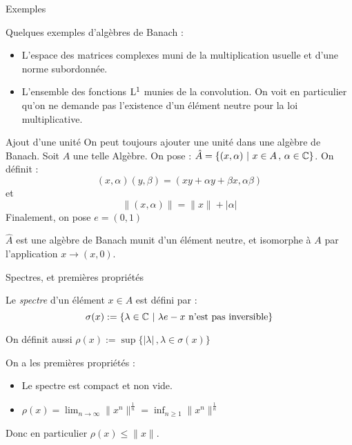 \documentclass[11pt, draft]{beamer}
\begin{document}
\begin{frame}{Exemples}
    
\begin{ex}
    Quelques exemples d'algèbres de Banach  :

    \begin{itemize}
        \item L'espace des matrices complexes muni de la multiplication usuelle et d'une norme subordonnée. 
        \item L'ensemble des fonctions $\mathrm{L}^1$ munies de la convolution. On voit en particulier qu'on ne demande pas
            l'existence d'un élément neutre pour la loi multiplicative.
    \end{itemize}
    \end{ex}
\end{frame}



\begin{frame}{Ajout d'une unité}
    On peut toujours ajouter une unité dans une algèbre de Banach. Soit $A$ une telle Algèbre.
    On pose :
    $\hat{A} = \{ ( x, \alpha) \ | \ x \in A \, ,\, \alpha \in \mathbb{C} \}$. On définit :
    \[
        (x, \alpha) ( y, \beta) = (xy + \alpha y + \beta x, \alpha \beta )
        \]
    et 
    \[
        \| (x, \alpha) \| = \|x\| + |\alpha|
        \]
    Finalement, on pose $e = (0, 1)$
    \begin{myth}
        $\hat{A}$ est une algèbre de Banach munit d'un élément neutre, et isomorphe à $A$ par l'application $x \to (x, 0) $.
    \end{myth}
\end{frame}

\begin{frame}{Spectres, et premières propriétés}
    \begin{mydef}
        Le \emph{spectre} d'un élément $x \in A$ est défini par :
        \[
            \sigma(x) := \{ \lambda \in \mathbb{C} \ | \ \lambda e - x  \ \text{n'est pas inversible} \} 
        \]
    \end{mydef}
    On définit aussi $\rho(x) := \sup \{ |\lambda| \, , \lambda \in \sigma(x) \}$

    On a les premières propriétés :

    \begin{myth}
        \begin{itemize}
                \item Le spectre est compact et non vide.
                \item $\rho(x) = \lim_{n \longrightarrow \infty} \| x^n \|^\frac{1}{n} = \inf_{n \geq 1} \| x^n \|^\frac{1}{n}$
        \end{itemize}
        Donc en particulier $\rho(x) \leq \| x \| $.
    \end{myth}
\end{frame}
\end{document}
